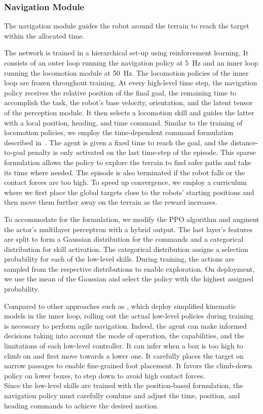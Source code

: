 \documentclass[conference]{IEEEtran}
\begin{document}
\subsubsection{Navigation Module}
The navigation module guides the robot around the terrain to reach the target within the allocated time. 

The network is trained in a hierarchical set-up using reinforcement learning. It consists of an outer loop running the navigation policy at \SI{5}{Hz} and an inner loop running the locomotion module at \SI{50}{Hz}. The locomotion policies of the inner loop are frozen throughout training. At every high-level time step, the navigation policy receives the relative position of the final goal, the remaining time to accomplish the task, the robot's base velocity, orientation, and the latent tensor of the perception module. It then selects a locomotion skill and guides the latter with a local position, heading, and time command.
Similar to the training of locomotion policies, we employ the time-dependent command formulation described in~\cite{rudinAdvancedSkills}. The agent is given a fixed time to reach the goal, and the distance-to-goal penalty is only activated on the last time-step of the episode. This sparse formulation allows the policy to explore the terrain to find safer paths and take its time where needed. The episode is also terminated if the robot falls or the contact forces are too high. 
To speed up convergence, we employ a curriculum where we first place the global targets close to the robots' starting positions and then move them further away on the terrain as the reward increases.

To accommodate for the formulation, we modify the PPO algorithm and augment the actor's multilayer perceptron with a hybrid output. The last layer's features are split to form a Gaussian distribution for the commands and a categorical distribution for skill activation. The categorical distribution assigns a selection probability for each of the low-level skills.
During training, the actions are sampled from the respective distributions to enable exploration. On deployment, we use the mean of the Gaussian and select the policy with the highest assigned probability.

Compared to other approaches such as \cite{hoeller2021DeepNav}, which deploy simplified kinematic models in the inner loop, rolling out the actual low-level policies during training is necessary to perform agile navigation. Indeed, the agent can make informed decisions taking into account 
the mode of operation, the capabilities, and the limitations of each low-level controller.
It can infer when a box is too high to climb on and first move towards a lower one. It carefully places the target on narrow passages to enable fine-grained foot placement. It favors the climb-down policy on lower boxes, to step down to avoid high contact forces. \\
Since the low-level skills are trained with the position-based formulation, the navigation policy must carefully combine and adjust the time, position, and heading commands to achieve the desired motion. 
\end{document}
